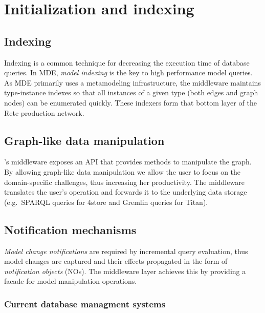 \section{Initialization and indexing}
\label{sec:indexing}

\subsection{Indexing}

Indexing is a common technique for decreasing the execution time of database queries. In MDE, \emph{model indexing} is the key to high performance model queries. As MDE primarily uses a metamodeling infrastructure, the \iqd{} middleware maintains type-instance indexes so that all instances of a given type (both edges and graph nodes) can be enumerated quickly. These indexers form that bottom layer of the Rete production network. 

\subsection{Graph-like data manipulation}

\iqd{}'s middleware exposes an API that provides methods to manipulate the graph. By allowing graph-like data manipulation we allow the user to focus on the domain-specific challenges, thus increasing her productivity. The middleware translates the user's operation and forwards it to the underlying data storage (e.g.\ SPARQL queries for 4store and Gremlin queries for Titan).

\subsection{Notification mechanisms}

\emph{Model change notifications} are required by incremental query evaluation, thus model changes are captured and their effects propagated in the form of \emph{notification objects} (NOs). The middleware layer achieves this by providing a facade for model manipulation operations. 





\subsubsection{Current database managment systems}

